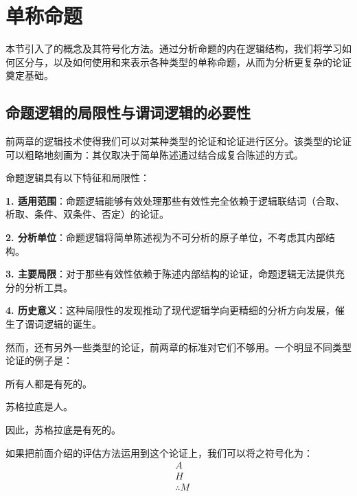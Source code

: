 \section{单称命题}

\begin{logicbox}[title=引言]
本节引入了的概念及其符号化方法。通过分析命题的内在逻辑结构，我们将学习如何区分与，以及如何使用和来表示各种类型的单称命题，从而为分析更复杂的论证奠定基础。
\end{logicbox}

\subsection{命题逻辑的局限性与谓词逻辑的必要性}

前两章的逻辑技术使得我们可以对某种类型的论证和论证进行区分。该类型的论证可以粗略地刻画为：其仅取决于简单陈述通过结合成复合陈述的方式。

\begin{theorembox}[title=命题逻辑的适用范围与局限]
命题逻辑具有以下特征和局限性：

\textbf{1. 适用范围}：命题逻辑能够有效处理那些有效性完全依赖于逻辑联结词（合取、析取、条件、双条件、否定）的论证。

\textbf{2. 分析单位}：命题逻辑将简单陈述视为不可分析的原子单位，不考虑其内部结构。

\textbf{3. 主要局限}：对于那些有效性依赖于陈述内部结构的论证，命题逻辑无法提供充分的分析工具。

\textbf{4. 历史意义}：这种局限性的发现推动了现代逻辑学向更精细的分析方向发展，催生了谓词逻辑的诞生。
\end{theorembox}

然而，还有另外一些类型的论证，前两章的标准对它们不够用。一个明显不同类型论证的例子是：

\begin{examplebox}[title=经典三段论实例]
所有人都是有死的。

苏格拉底是人。

因此，苏格拉底是有死的。
\end{examplebox}

如果把前面介绍的评估方法运用到这个论证上，我们可以将之符号化为：
$$
\begin{aligned}
& A \\
& H \\
& \therefore M
\end{aligned}
$$

